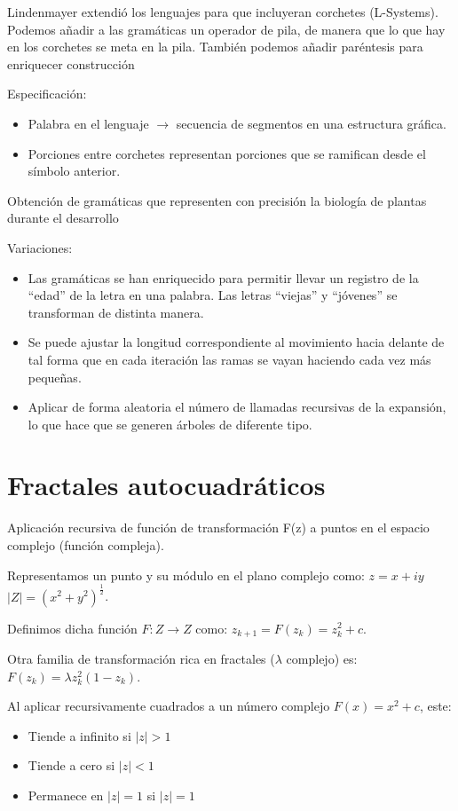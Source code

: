 Lindenmayer extendió los lenguajes para que incluyeran corchetes (L-Systems). Podemos añadir a las gramáticas un operador de pila, de manera que lo que hay en los corchetes se meta en la pila. También podemos añadir paréntesis para enriquecer construcción

Especificación:
\begin{itemize}
	\item Palabra en el lenguaje $\rightarrow$ secuencia de segmentos en una estructura gráfica.
	\item Porciones entre corchetes representan porciones que se ramifican desde el símbolo anterior.
\end{itemize}

Obtención de gramáticas que representen con precisión la biología de plantas durante el desarrollo

Variaciones:
\begin{itemize}
	\item Las gramáticas se han enriquecido para permitir llevar un registro de la “edad” de la letra en una palabra. Las letras “viejas” y “jóvenes” se transforman de distinta manera.
	\item Se puede ajustar la longitud correspondiente al movimiento hacia delante de tal forma que en cada iteración las ramas se vayan haciendo cada vez más pequeñas.
	\item Aplicar de forma aleatoria el número de llamadas recursivas de la expansión, lo que hace que se generen árboles de diferente tipo.
\end{itemize}

\section{Fractales autocuadráticos}
Aplicación recursiva de función de transformación F(z) a puntos en el
espacio complejo (función compleja).

Representamos un punto y su módulo en el plano complejo como: $z=x+iy$ $|Z|=(x^2+y^2)^{\frac{1}{2}}$.

Definimos dicha función $F:Z \rightarrow Z$ como: $z_{k+1}=F(z_k)=z^2_k + c$.

Otra familia de transformación rica en fractales ($\lambda$ complejo) es: $F(z_k)=\lambda z^2_k(1-z_k)$.

Al aplicar recursivamente cuadrados a un número complejo $F(x)=x^2+c$, este:
\begin{itemize}
	\item Tiende a infinito si $|z|>1$
	\item Tiende a cero si $|z|<1$
	\item Permanece en $|z|=1$ si $|z|=1$
\end{itemize}

